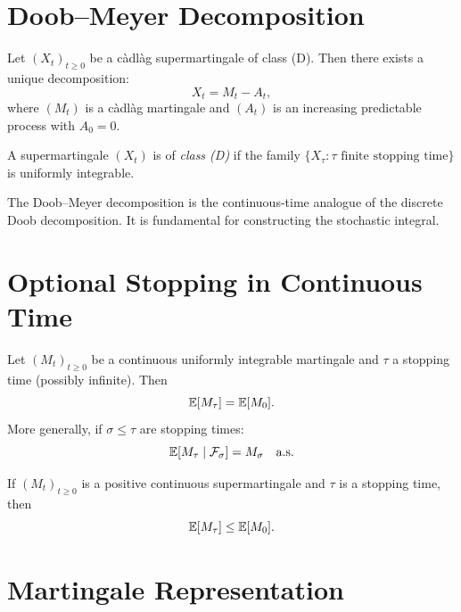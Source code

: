 \section{Doob--Meyer Decomposition}

\begin{theorem}
\label{thm:doob_meyer}
Let $(X_t)_{t \geq 0}$ be a c\`adl\`ag supermartingale of class (D). Then there
exists a unique decomposition:
\[
  X_t = M_t - A_t,
\]
where $(M_t)$ is a c\`adl\`ag martingale and $(A_t)$ is an increasing predictable
process with $A_0 = 0$.
\end{theorem}

\begin{definition}[Class (D)]
A supermartingale $(X_t)$ is of \emph{class (D)} if the family
$\{X_{\tau} : \tau \text{ finite stopping time}\}$ is uniformly integrable.
\end{definition}

\begin{remark}
The Doob--Meyer decomposition is the continuous-time analogue of the discrete
Doob decomposition. It is fundamental for constructing the stochastic integral.
\end{remark}

\section{Optional Stopping in Continuous Time}

\begin{theorem}
\label{thm:ost_continuous}
Let $(M_t)_{t \geq 0}$ be a continuous uniformly integrable martingale and
$\tau$ a stopping time (possibly infinite). Then
\[
  \mathbb{E}[M_{\tau}] = \mathbb{E}[M_0].
\]
More generally, if $\sigma \leq \tau$ are stopping times:
\[
  \mathbb{E}[M_{\tau} \mid \mathcal{F}_{\sigma}] = M_{\sigma} \quad \text{a.s.}
\]
\end{theorem}

\begin{theorem}
\label{thm:stop_supermartingale}
If $(M_t)_{t \geq 0}$ is a positive continuous supermartingale and $\tau$ is a
stopping time, then
\[
  \mathbb{E}[M_{\tau}] \leq \mathbb{E}[M_0].
\]
\end{theorem}

\section{Martingale Representation}

